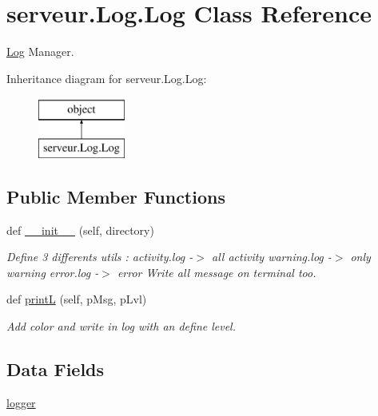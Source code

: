 \hypertarget{classserveur_1_1_log_1_1_log}{}\section{serveur.\+Log.\+Log Class Reference}
\label{classserveur_1_1_log_1_1_log}


\hyperlink{classserveur_1_1_log_1_1_log}{Log} Manager.  


Inheritance diagram for serveur.\+Log.\+Log\+:\begin{figure}[H]
\begin{center}
\leavevmode
\includegraphics[height=2.000000cm]{classserveur_1_1_log_1_1_log}
\end{center}
\end{figure}
\subsection*{Public Member Functions}
\begin{DoxyCompactItemize}
\item 
def \hyperlink{classserveur_1_1_log_1_1_log_aa7cbfc0ba2e3b10a85d62cbf714034f3}{\+\_\+\+\_\+init\+\_\+\+\_\+} (self, directory)
\begin{DoxyCompactList}\small\item\em Define 3 differents utils \+: activity.\+log -\/$>$ all activity warning.\+log -\/$>$ only warning error.\+log -\/$>$ error Write all message on terminal too. \end{DoxyCompactList}\item 
def \hyperlink{classserveur_1_1_log_1_1_log_a299a7a7876bc070973d6282841122b61}{print\+L} (self, p\+Msg, p\+Lvl)
\begin{DoxyCompactList}\small\item\em Add color and write in log with an define level. \end{DoxyCompactList}\end{DoxyCompactItemize}
\subsection*{Data Fields}
\begin{DoxyCompactItemize}
\item 
\hyperlink{classserveur_1_1_log_1_1_log_a6d5e880653285603a27323c4d732c9a7}{logger}
\end{DoxyCompactItemize}


